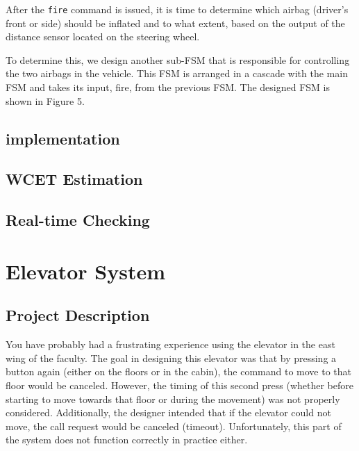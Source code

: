 \documentclass[12pt	]{article}
\begin{document}
After the \texttt{fire} command is issued, it is time to determine which airbag (driver's front or side) should be inflated and to what extent, based on the output of the distance sensor located on the steering wheel.

To determine this, we design another sub-FSM that is responsible for controlling the two airbags in the vehicle. This FSM is arranged in a cascade with the main FSM and takes its input, fire, from the previous FSM. The designed FSM is shown in Figure 5.










\subsection{implementation}
\subsection{WCET Estimation}
\subsection{Real-time Checking}











\newpage

\section{Elevator System}


\subsection{Project Description}
You have probably had a frustrating experience using the elevator in the east wing of the faculty. The goal in designing this elevator was that by pressing a button again (either on the floors or in the cabin), the command to move to that floor would be canceled. However, the timing of this second press (whether before starting to move towards that floor or during the movement) was not properly considered. Additionally, the designer intended that if the elevator could not move, the call request would be canceled (timeout). Unfortunately, this part of the system does not function correctly in practice either.
\end{document}
